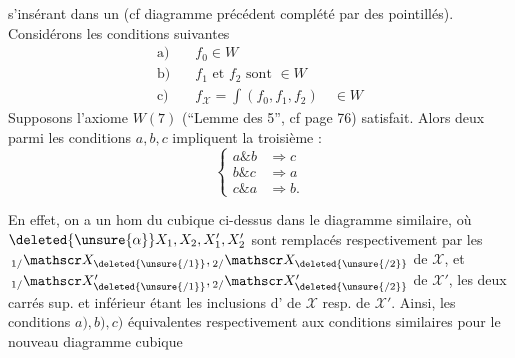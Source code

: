 s'insérant dans un   (cf diagramme précédent complété par des pointillés). Considérons les conditions suivantes
\[
\begin{aligned}
\text{a)}\quad & f_0\in W\\
\text{b)}\quad & f_1\text{ et }f_2\text{ sont }\in W\\
\text{c)}\quad & f_{\mathscr X}=\int(f_0,f_1,f_2)\quad\in W
\end{aligned}
\]
Supposons l'axiome $W(7)$ (\textquotedblleft Lemme des 5\textquotedblright, cf page 76) satisfait. Alors deux  parmi les conditions $a,b,c$ impliquent la troisième :
\[
\left\{\begin{aligned}
a\mathbin{\&} b&\Longrightarrow c\\
b\mathbin{\&} c&\Longrightarrow a\\
c\mathbin{\&} a&\Longrightarrow b .
\end{aligned}\right.
\]

En effet, on a un hom du   cubique ci-dessus dans le diagramme similaire, où $\deleted{\unsure{\alpha}}X_1,X_2,X'_1,X'_2$ sont remplacés respectivement par les \uline{} $\,{}_{1/}\mathscr X_{\deleted{\unsure{/1}}},{}_{2/}\mathscr X_{\deleted{\unsure{/2}}}$ de $\mathscr X$, et $\,{}_{1/}\mathscr X'_{\deleted{\unsure{/1}}},{}_{2/}\mathscr X'_{\deleted{\unsure{/2}}}$ de $\mathscr X'$, les deux carrés sup. et inférieur étant les inclusions d' de $\mathscr X$ resp. de $\mathscr X'$. Ainsi, les conditions $a),b),c)$  équivalentes respectivement aux conditions similaires pour le nouveau diagramme cubique
